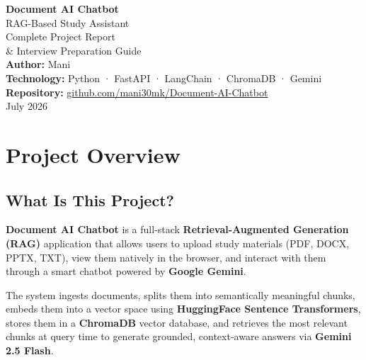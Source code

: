 \documentclass[12pt,a4paper]{article}
\begin{document}
\begin{titlepage}
  \centering
  \vspace*{3cm}
  {\Huge\bfseries\color{accentblue} Document AI Chatbot}\\[0.6cm]
  {\LARGE RAG-Based Study Assistant}\\[1.2cm]
  {\Large Complete Project Report \\ \& Interview Preparation Guide}\\[2cm]
  {\large\textbf{Author:} Mani}\\[0.4cm]
  {\large\textbf{Technology:} Python · FastAPI · LangChain · ChromaDB · Gemini}\\[0.4cm]
  {\large\textbf{Repository:} \href{https://github.com/mani30mk/Document-AI-Chatbot}{github.com/mani30mk/Document-AI-Chatbot}}\\[2cm]
  {\large July 2026}
  \vfill
\end{titlepage}

\tableofcontents
\newpage

\section{Project Overview}

\subsection{What Is This Project?}
\textbf{Document AI Chatbot} is a full-stack \textbf{Retrieval-Augmented Generation (RAG)} application that allows users to upload study materials (PDF, DOCX, PPTX, TXT), view them natively in the browser, and interact with them through a smart chatbot powered by \textbf{Google Gemini}.

The system ingests documents, splits them into semantically meaningful chunks, embeds them into a vector space using \textbf{HuggingFace Sentence Transformers}, stores them in a \textbf{ChromaDB} vector database, and retrieves the most relevant chunks at query time to generate grounded, context-aware answers via \textbf{Gemini 2.5 Flash}.
\end{document}

